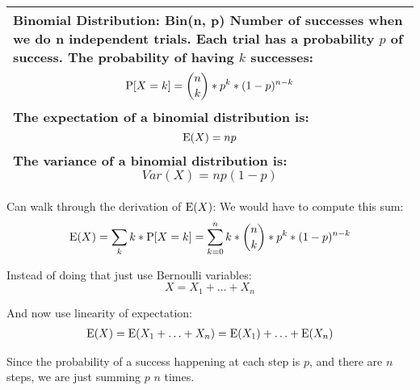 {\tabulinesep=1mm
\begin{tabu}{|p{16cm} |}
\hline
\vspace{2 mm}
\textbf{Binomial Distribution: Bin(n, p)}
Number of successes when we do n independent trials. Each trial has a 
probability $p$ of success. The probability of having $k$ successes:
\[ \P[X = k] = {n \choose k} * p^k * (1 - p)^{n - k}  \]
The expectation of a binomial distribution is:
\[ \E(X) = np \]
The variance of a binomial distribution is:
\[ Var(X) = np(1-p) \]
\\
\hline
\end{tabu}
}

\begin{solution} %
Can walk through the derivation of $\E(X)$: 
We would have to compute this sum:
\[\E(X) = \sum_{k} k * \P[X = k] = \sum_{k = 0}^{n} k * {n \choose k} * 
p^k * (1 - p)^{n - k} \]

Instead of doing that just use Bernoulli variables:
\[ X = X_1 + \dotsc + X_n \]

And now use linearity of expectation:
\begin{equation}
\begin{split}
\E(X) = \E(X_1 + \dotsc + X_n) = \E(X_1) + \dotsc + \E(X_n) \nonumber
\end{split}
\end{equation}

Since the probability of a success happening at each step is $p$, and 
there are $n$ steps, we are just summing $p$  $n$ times.
\end{solution}